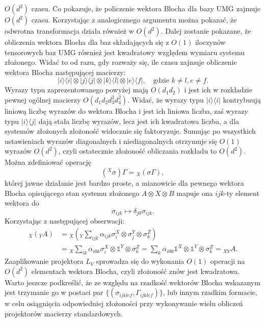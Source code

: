 \documentclass[10pt]{article} %
\newcommand{\Ket}[1]{|#1\rangle}
\newcommand{\Bra}[1]{\langle#1|}
\newcommand{\I}{\mathbb{1}}
\begin{document}
\begin{appendices}
$O(d^2)$ czasu. Co pokazuje, że policzenie wektora Blocha dla bazy UMG zajmuje $O(d^2)$ czasu. Korzystając z analogicznego argumentu można pokazać, że odwrotna transformacja działa również w $O(d^2)$. Dalej zostanie pokazane, że obliczenia wektora Blocha dla baz składających się z $O(1)$ iloczynów tensorowych baz UMG również jest kwadratowy względem wymiaru systemu złożonego. Widać to od razu, gdy rozważy się, ile czasu zajmuje obliczenie wektora Blocha następującej macierzy:
\begin{equation}
\Ket{i}\Bra{i} \otimes \Ket{j}\Bra{j} \otimes \Ket{k}\Bra{l} \otimes \Ket{e}\Bra{f}, \quad \text{gdzie }k \neq l, e \neq f.
\end{equation} Wyrazy typu zaprezentowanego powyżej mają $O(d_1d_2)$ i jest ich w rozkładzie pewnej ogólnej macierzy $O(d_1d_2d_3^2d_4^2)$. Widać, że wyrazy typu $\Ket{i}\Bra{i}$ kontrybuują liniową liczbę wyrazów do wektora Blocha i jest ich liniowa liczba, zaś wyrazy typu $\Ket{i}\Bra{j}$ dają stała liczbę wyrazów, lecz jest ich kwadratowa liczba, a dla systemów złożonych złożoność widocznie się faktoryzuje. Sumując po wszystkich ustawieniach wyrazów diagonalnych i niediagonalnych otrzymuje się $O(1)$ wyrazów $O(d^2)$, czyli ostatecznie złożoność obliczania rozkładu to $O(d^2)$.
Można zdefiniować operację
\begin{equation}
({}^X\sigma) \Gamma = {}_X(\sigma\Gamma),
\end{equation} której jawne działanie jest bardzo proste, a mianowicie dla pewnego wektora Blocha opisującego stan systemu złożonego $A \otimes X \otimes B$ mapuje ona $ijk$-ty element wektora do
\begin{equation}
\sigma_{ijk} \mapsto \delta_{j0}\sigma_{ijk}.
\end{equation}
Korzystając z następującej obserwacji:
\begin{equation}
\begin{split}
{}_{X}({}_{Y}A) &= {}_{X}({}_{Y} \sum_{ijk} \alpha_{ijk} \sigma_i^X \otimes \sigma_j^Y\otimes \sigma_k^Z)\\ &= {}_X \sum_{ik} \alpha_{i0k} \sigma_i^X \otimes \I^Y \otimes \sigma_k^Z = \sum_k \alpha_{i00} \I^X\otimes \I^Y \otimes \sigma_k^Z = {}_{XY} A.
\end{split}
\end{equation} Zaaplikowanie projektora $L_V$ sprowadza się do wykonania $O(1)$ operacji na $O(d^2)$ elementach wektora Blocha, czyli złożoność znów jest kwadratowa.
Warto jeszcze podkreślić, że ze względu na rzadkość wektorów Blocha wskazanym jest trzymanie go w postaci par $\{ (\sigma_{ijklef}, \Gamma_{ijklef}) \}$, lub innym rzadkim formacie, w celu osiągnięcia odpowiedniej złożoności przy wykonywanie wielu obliczeń projektorów macierzy standardowych.

\end{appendices}
\end{document}
